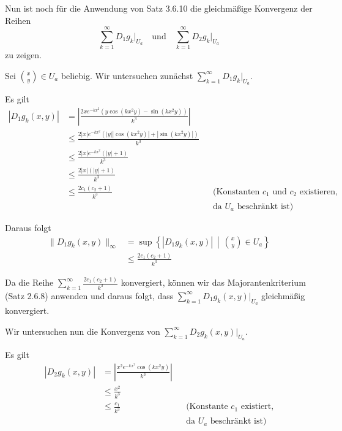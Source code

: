 \documentclass[a4paper,12pt]{article}
\begin{document}
\begin{enumerate}[label=\alph*)]
          Nun ist noch für die Anwendung von Satz 3.6.10 die gleichmäßige Konvergenz der Reihen
          \[
              \sum_{k=1}^{\infty} D_1 g_k \big|_{U_a} \quad \text{und} \quad \sum_{k=1}^{\infty} D_2 g_k \big|_{U_a}
          \]
          zu zeigen.

          Sei $\binom{x}{y} \in U_a$ beliebig. Wir untersuchen zunächst $\sum_{k=1}^{\infty} D_1 g_k \big|_{U_a}$.

          Es gilt
          \begin{align*}
              |D_1 g_k(x,y)| & = \left| \frac{2 x e^{-kx^2} \left( y \cos(kx^2 y) - \sin(kx^2 y) \right)}{k^3} \right|         \\
                             & \leq \frac{2 |x| e^{-kx^2} \left( |y| |\cos(kx^2 y)| + |\sin(kx^2 y)| \right)}{k^3}             \\
                             & \leq \frac{2 |x| e^{-kx^2} (|y| + 1)}{k^3}                                                      \\
                             & \leq \frac{2 |x| (|y| + 1)}{k^3}                                                                \\
                             & \leq \frac{2 c_1 (c_2 + 1)}{k^3} && \text{(Konstanten } c_1 \text{ und } c_2 \text{ existieren,} \\
                             &                                  && \text{da } U_a \text{ beschränkt ist)}
          \end{align*}

          Daraus folgt
          \begin{align*}
              \| D_1 g_k(x,y) \|_\infty & = \sup \left\{ |D_1 g_k(x,y)| \,\middle|\, \binom{x}{y} \in U_a \right\} \\
                                        & \leq \frac{2 c_1 (c_2 + 1)}{k^3}
          \end{align*}

          Da die Reihe $\sum_{k=1}^{\infty} \frac{2 c_1 (c_2 + 1)}{k^3}$ konvergiert, können wir das
          Majorantenkriterium (Satz 2.6.8) anwenden und daraus folgt, dass
          $\sum_{k=1}^{\infty} D_1 g_k(x,y) \big|_{U_a}$ gleichmäßig konvergiert.

          Wir untersuchen nun die Konvergenz von $\sum_{k=1}^{\infty} D_2 g_k(x,y) \big|_{U_a}$.

          Es gilt
          \begin{align*}
              |D_2 g_k(x,y)| & = \left| \frac{x^2 e^{-kx^2} \cos(kx^2 y)}{k^3} \right|                    \\
                             & \leq \frac{x^2}{k^3}                                                       \\
                             & \leq \frac{c_1}{k^3} && \text{(Konstante } c_1 \text{ existiert,}          \\
                             &                      && \text{da } U_a \text{ beschränkt ist)}
          \end{align*}


\end{enumerate}
\end{document}
